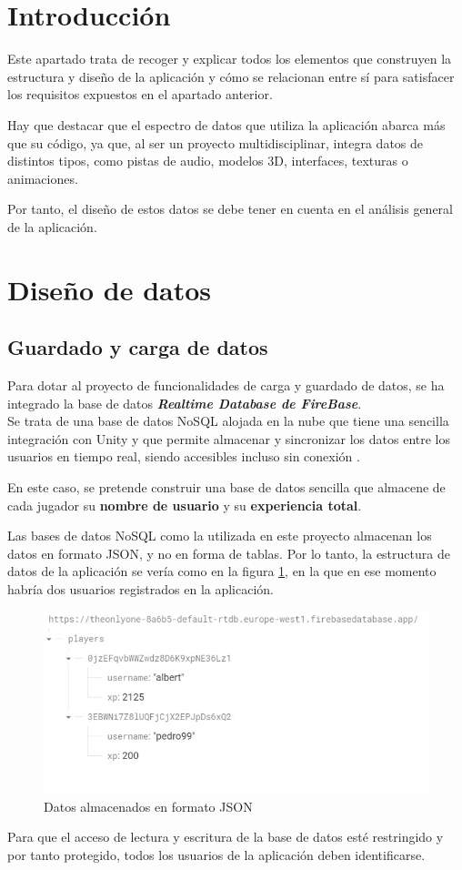 
\section{Introducción}
Este apartado trata de recoger y explicar todos los elementos que construyen la estructura y diseño de la aplicación y cómo se relacionan entre sí para satisfacer los requisitos expuestos en el apartado anterior.

Hay que destacar que el espectro de datos que utiliza la aplicación abarca más que su código, ya que, al ser un proyecto multidisciplinar, integra datos de distintos tipos, como pistas de audio, modelos 3D, interfaces, texturas o animaciones.

Por tanto, el diseño de estos datos se debe tener en cuenta en el análisis general de la aplicación. 

\section{Diseño de datos} 
\subsection{Guardado y carga de datos}
Para dotar al proyecto de funcionalidades de carga y guardado de datos, se ha integrado la base de datos \textbf{\textit{Realtime Database de FireBase}}.\\
Se trata de una base de datos NoSQL alojada en la nube que tiene una sencilla integración con Unity y que permite almacenar y sincronizar los datos entre los usuarios en tiempo real, siendo accesibles incluso sin conexión \cite{wiki:Firebase}.

En este caso, se pretende construir una base de datos sencilla que almacene de cada jugador su \textbf{nombre de usuario} y su \textbf{experiencia total}.

Las bases de datos NoSQL como la utilizada en este proyecto almacenan los datos en formato JSON, y no en forma de tablas. Por lo tanto, la estructura de datos de la aplicación se vería como en la figura \ref{fig:EstructuraJSON}, en la que en ese momento habría dos usuarios registrados en la aplicación.
\begin{figure}[h]
	\centering
	\includegraphics[scale=0.45]{img/DatabaseNoSQL.jpg}
	\caption{Datos almacenados en formato JSON}
	\label{fig:EstructuraJSON}
    \end{figure}
Para que el acceso de lectura y escritura de la base de datos esté restringido y por tanto protegido, todos los usuarios de la aplicación deben identificarse.

